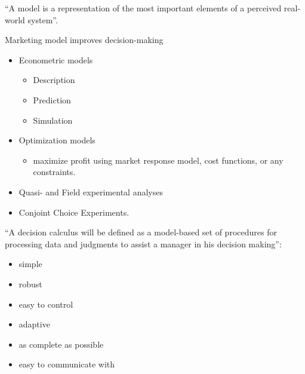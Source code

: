 \documentclass[
]{book}
\providecommand{\tightlist}{%
  \setlength{\itemsep}{0pt}\setlength{\parskip}{0pt}}
\begin{document}
``A model is a representation of the most important elements of a perceived real-world system''.

Marketing model improves decision-making

\begin{itemize}
\item
  Econometric models

  \begin{itemize}
  \tightlist
  \item
    Description
  \item
    Prediction
  \item
    Simulation
  \end{itemize}
\item
  Optimization models

  \begin{itemize}
  \tightlist
  \item
    maximize profit using market response model, cost functions, or any constraints.
  \end{itemize}
\item
  Quasi- and Field experimental analyses
\item
  Conjoint Choice Experiments.
\end{itemize}

``A decision calculus will be defined as a model-based set of procedures for processing data and judgments to assist a manager in his decision making''\citep{Little_1976}:

\begin{itemize}
\tightlist
\item
  simple
\item
  robust
\item
  easy to control
\item
  adaptive
\item
  as complete as possible
\item
  easy to communicate with
\end{itemize}
\end{document}
